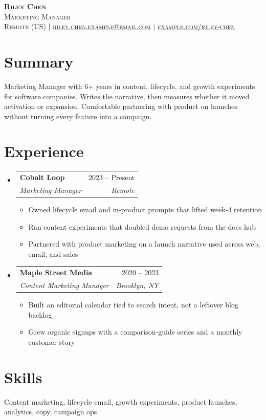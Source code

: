 \documentclass[letterpaper,11pt]{article}
\makeatletter
\newcommand{\resumeItem}[1]{\item\small{#1 \vspace{2pt}}}
\newcommand{\resumeSubheading}[4]{
  \vspace{-2pt}\item
  \begin{tabular*}{0.97\textwidth}[t]{l@{\extracolsep{\fill}}r}
    \textbf{#1} & #2 \\
    \textit{\small#3} & \textit{\small #4} \\
  \end{tabular*}\vspace{-7pt}
}
\newcommand{\resumeSubHeadingListStart}{\begin{itemize}[leftmargin=0.15in, label={}]}
\newcommand{\resumeSubHeadingListEnd}{\end{itemize}}
\newcommand{\resumeItemListStart}{\begin{itemize}}
\newcommand{\resumeItemListEnd}{\end{itemize}\vspace{-5pt}}
\makeatother
\begin{document}
\begin{center}
  \textbf{\Huge \scshape Riley Chen} \\ \vspace{2pt}
  \small \scshape Marketing Manager \\ \vspace{8pt}
  \footnotesize Remote (US)
  \enspace$\vert$\enspace
  \href{mailto:riley.chen.example@email.com}{\underline{riley.chen.example@email.com}}
  \enspace$\vert$\enspace
  \href{https://example.com/riley-chen}{\underline{example.com/riley-chen}}
\end{center}

\section{Summary}
\small{
Marketing Manager with 6+ years in content, lifecycle, and growth experiments for software companies.
Writes the narrative, then measures whether it moved activation or expansion.
Comfortable partnering with product on launches without turning every feature into a campaign.
}

\section{Experience}
\resumeSubHeadingListStart
  \resumeSubheading
  {Cobalt Loop}{2023 -- Present}
  {Marketing Manager}{Remote}
  \resumeItemListStart
    \resumeItem{Owned lifecycle email and in-product prompts that lifted week-4 retention}
    \resumeItem{Ran content experiments that doubled demo requests from the docs hub}
    \resumeItem{Partnered with product marketing on a launch narrative used across web, email, and sales}
  \resumeItemListEnd
  \resumeSubheading
  {Maple Street Media}{2020 -- 2023}
  {Content Marketing Manager}{Brooklyn, NY}
  \resumeItemListStart
    \resumeItem{Built an editorial calendar tied to search intent, not a leftover blog backlog}
    \resumeItem{Grew organic signups with a comparison-guide series and a monthly customer story}
  \resumeItemListEnd
\resumeSubHeadingListEnd

\section{Skills}
\small{Content marketing, lifecycle email, growth experiments, product launches, analytics, copy, campaign ops}
\end{document}
